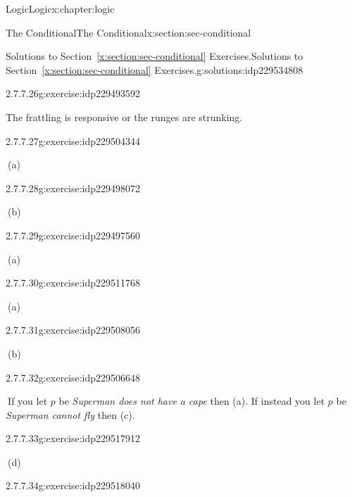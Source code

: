 \documentclass[twoside,10pt,]{book}
\newcommand{\xreffont}{\relax}
\numberwithin{equation}{section}
\begin{document}
\begin{chapterptx}{Logic}{}{Logic}{}{}{x:chapter:logic}
\begin{sectionptx}{The Conditional}{}{The Conditional}{}{}{x:section:sec-conditional}
\begin{solutions-subsection}{Solutions to Section~{\xreffont\ref*{x:section:sec-conditional}} Exercises.}{}{Solutions to Section~{\xreffont\ref*{x:section:sec-conditional}} Exercises.}{}{}{g:solutions:idp229534808}
\begin{exercisegroup}
\begin{divisionsolutioneg}{2.7.7.26}{}{g:exercise:idp229493592}%
\par\smallskip%
\noindent\hypertarget{g:solution:idp229498840-main}{}The frattling is responsive or the runges are strunking.\end{divisionsolutioneg}%
\end{exercisegroup}
\par\medskip\noindent
\begin{divisionsolution}{2.7.7.27}{}{g:exercise:idp229504344}%
\par\smallskip%
\noindent\hypertarget{g:solution:idp229498584-main}{}\(\ \)(a)\end{divisionsolution}%
\begin{divisionsolution}{2.7.7.28}{}{g:exercise:idp229498072}%
\par\smallskip%
\noindent\hypertarget{g:solution:idp229498456-main}{}\(\ \)(b)\end{divisionsolution}%
\begin{divisionsolution}{2.7.7.29}{}{g:exercise:idp229497560}%
\par\smallskip%
\noindent\hypertarget{g:solution:idp229510360-main}{}\(\ \)(a)\end{divisionsolution}%
\begin{divisionsolution}{2.7.7.30}{}{g:exercise:idp229511768}%
\par\smallskip%
\noindent\hypertarget{g:solution:idp229509464-main}{}\(\ \)(a)\end{divisionsolution}%
\begin{divisionsolution}{2.7.7.31}{}{g:exercise:idp229508056}%
\par\smallskip%
\noindent\hypertarget{g:solution:idp229507544-main}{}\(\ \)(b)\end{divisionsolution}%
\begin{divisionsolution}{2.7.7.32}{}{g:exercise:idp229506648}%
\par\smallskip%
\noindent\hypertarget{g:solution:idp229520856-main}{}\(\ \)If you let \(p\) be \emph{Superman does not have a cape} then (a).  If instead you let \(p\) be \emph{Superman cannot fly} then (c).\end{divisionsolution}%
\begin{divisionsolution}{2.7.7.33}{}{g:exercise:idp229517912}%
\par\smallskip%
\noindent\hypertarget{g:solution:idp229515224-main}{}\(\ \)(d)\end{divisionsolution}%
\begin{divisionsolution}{2.7.7.34}{}{g:exercise:idp229518040}%

\end{divisionsolution}
\end{solutions-subsection}
\end{sectionptx}
\end{chapterptx}
\end{document}
